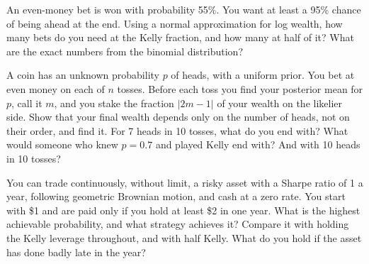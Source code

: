 \begin{question}\label{iq:iv2:betting-and-kelly:33}
An even-money bet is won with probability 55\%. You want at least a 95\% chance of being ahead at the end. Using a normal approximation for log wealth, how many bets do you need at the Kelly fraction, and how many at half of it? What are the exact numbers from the binomial distribution?
\end{question}

\begin{question}\label{iq:iv2:betting-and-kelly:34}
A coin has an unknown probability $p$ of heads, with a uniform prior. You bet at even money on each of $n$ tosses. Before each toss you find your posterior mean for $p$, call it $m$, and you stake the fraction $|2m - 1|$ of your wealth on the likelier side. Show that your final wealth depends only on the number of heads, not on their order, and find it. For 7 heads in 10 tosses, what do you end with? What would someone who knew $p = 0.7$ and played Kelly end with? And with 10 heads in 10 tosses?
\end{question}

\begin{question}\label{iq:iv2:betting-and-kelly:35}
You can trade continuously, without limit, a risky asset with a Sharpe ratio of 1 a year, following geometric Brownian motion, and cash at a zero rate. You start with \$1 and are paid only if you hold at least \$2 in one year. What is the highest achievable probability, and what strategy achieves it? Compare it with holding the Kelly leverage throughout, and with half Kelly. What do you hold if the asset has done badly late in the year?
\end{question}
